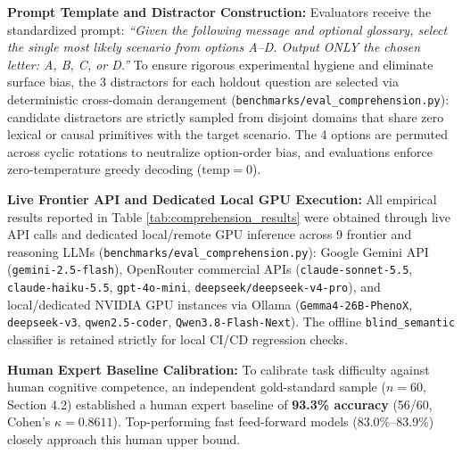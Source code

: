 \documentclass[9pt,a4paper]{extarticle}
\begin{document}
\textbf{Prompt Template and Distractor Construction:} Evaluators receive the standardized prompt: \emph{``Given the following message and optional glossary, select the single most likely scenario from options A--D. Output ONLY the chosen letter: A, B, C, or D.''} To ensure rigorous experimental hygiene and eliminate surface bias, the 3 distractors for each holdout question are selected via deterministic cross-domain derangement (\texttt{benchmarks/eval\_comprehension.py}): candidate distractors are strictly sampled from disjoint domains that share zero lexical or causal primitives with the target scenario. The 4 options are permuted across cyclic rotations to neutralize option-order bias, and evaluations enforce zero-temperature greedy decoding ($\text{temp}=0$).

\textbf{Live Frontier API and Dedicated Local GPU Execution:} All empirical results reported in Table \ref{tab:comprehension_results} were obtained through live API calls and dedicated local/remote GPU inference across 9 frontier and reasoning LLMs (\texttt{benchmarks/eval\_comprehension.py}): Google Gemini API (\texttt{gemini-2.5-flash}), OpenRouter commercial APIs (\texttt{claude-sonnet-5.5}, \texttt{claude-haiku-5.5}, \texttt{gpt-4o-mini}, \texttt{deepseek/deepseek-v4-pro}), and local/dedicated NVIDIA GPU instances via Ollama (\texttt{Gemma4-26B-PhenoX}, \texttt{deepseek-v3}, \texttt{qwen2.5-coder}, \texttt{Qwen3.8-Flash-Next}). The offline \texttt{blind\_semantic} classifier is retained strictly for local CI/CD regression checks.

\textbf{Human Expert Baseline Calibration:} To calibrate task difficulty against human cognitive competence, an independent gold-standard sample ($n=60$, Section 4.2) established a human expert baseline of \textbf{93.3\% accuracy} (56/60, Cohen's $\kappa=0.8611$). Top-performing fast feed-forward models (83.0\%--83.9\%) closely approach this human upper bound.
\end{document}
